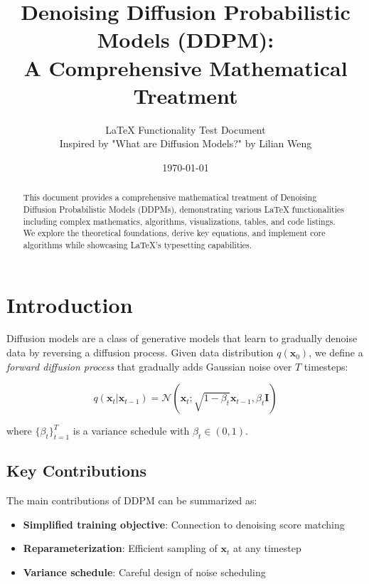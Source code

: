 \documentclass[11pt,a4paper]{article}
\title{\Large \textbf{Denoising Diffusion Probabilistic Models (DDPM):\\A Comprehensive Mathematical Treatment}}
\author{LaTeX Functionality Test Document\\Inspired by "What are Diffusion Models?" by Lilian Weng}
\date{\today}
\theoremstyle{definition}
\newcommand{\N}{\mathcal{N}}
\begin{document}
\maketitle

\begin{abstract}
This document provides a comprehensive mathematical treatment of Denoising Diffusion Probabilistic Models (DDPMs), demonstrating various LaTeX functionalities including complex mathematics, algorithms, visualizations, tables, and code listings. We explore the theoretical foundations, derive key equations, and implement core algorithms while showcasing LaTeX's typesetting capabilities.
\end{abstract}

\tableofcontents
\newpage

\section{Introduction}

Diffusion models are a class of generative models that learn to gradually denoise data by reversing a diffusion process. Given data distribution $q(\mathbf{x}_0)$, we define a \textit{forward diffusion process} that gradually adds Gaussian noise over $T$ timesteps:

\begin{equation}
    q(\mathbf{x}_t | \mathbf{x}_{t-1}) = \N(\mathbf{x}_t; \sqrt{1-\beta_t}\mathbf{x}_{t-1}, \beta_t\mathbf{I})
    \label{eq:forward_step}
\end{equation}

where $\{\beta_t\}_{t=1}^T$ is a variance schedule with $\beta_t \in (0,1)$.

\subsection{Key Contributions}

The main contributions of DDPM can be summarized as:

\begin{itemize}[leftmargin=*]
    \item \textbf{Simplified training objective}: Connection to denoising score matching
    \item \textbf{Reparameterization}: Efficient sampling of $\mathbf{x}_t$ at any timestep
    \item \textbf{Variance schedule}: Careful design of noise scheduling
\end{itemize}
\end{document}
